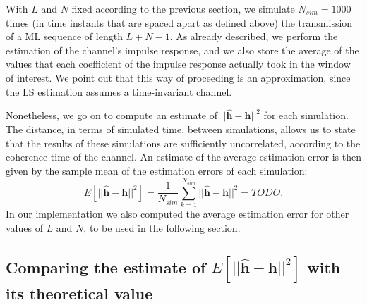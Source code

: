 \documentclass[10pt]{article}
\begin{document}
With $L$ and $N$ fixed according to the previous section, we simulate $N_{sim}=1000$ times (in time instants that are spaced apart as defined above) the transmission of a ML sequence of length $L+N-1$. As already described, we perform the estimation of the channel's impulse response, and we also store the average of the values that each coefficient of the impulse response actually took in the window of interest. We point out that this way of proceeding is an approximation, since the LS estimation assumes a time-invariant channel.

Nonetheless, we go on to compute an estimate of $||\mathbf{\hat{h}}-\mathbf{h}||^2$ for each simulation. The distance, in terms of simulated time, between simulations, allows us to state that the results of these simulations are sufficiently uncorrelated, according to the coherence time of the channel. An estimate of the average estimation error is then given by the sample mean of the estimation errors of each simulation:
\begin{equation}
E[||\mathbf{\hat{h}}-\mathbf{h}||^2] = \frac{1}{N_{sim}}\sum_{k=1}^{N_{sim}} ||\mathbf{\hat{h}}-\mathbf{h}||^2 = TODO.
\end{equation}
In our implementation we also computed the average estimation error for other values of $L$ and $N$, to be used in the following section.


\subsection*{Comparing the estimate of $E[||\mathbf{\hat{h}}-\mathbf{h}||^2]$ with its theoretical value}
\end{document}
